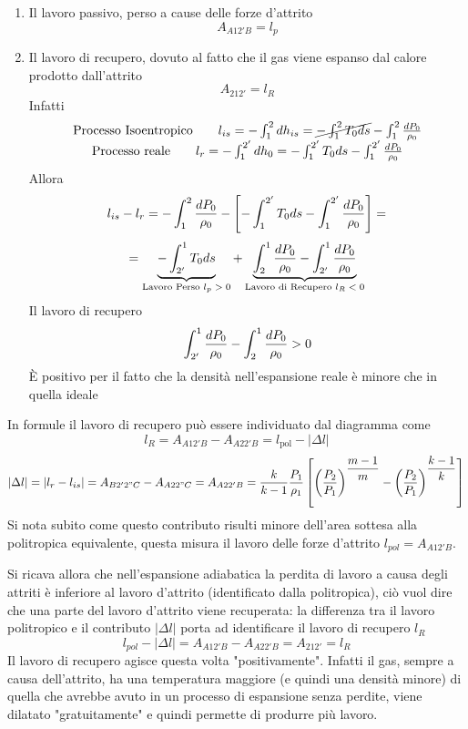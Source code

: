 \begin{adjustwidth}{2in}{}
	\begin{enumerate}
		\item Il lavoro passivo, perso a cause delle forze d'attrito
		\[A_{A12'B} = l_p\]
		\item Il lavoro di recupero, dovuto al fatto che il gas viene espanso dal calore prodotto dall'attrito 
		\[A_{212'} = l_R\]			
		Infatti
		\[\begin{matrix}
			\text{Processo Isoentropico}\qquad l_{is} = -\int_{1}^{2}dh_{is} = \cancel{-\int_{1}^{2}T_0ds}  -\int_{1}^{2} {dP_0\over\rho_0} \\
			\text{Processo reale}\qquad l_r = -\int_{1}^{2'}dh_0 = -\int_{1}^{2'}T_0ds - \int_{1}^{2'} {dP_0\over\rho_0} \\
		\end{matrix}\]
		Allora 
		\[l_{is} - l_r = -\int_{1}^{2} {dP_0\over\rho_0} - \left[-\int_{1}^{2'}T_0ds - \int_{1}^{2'} {dP_0\over\rho_0}\right] = \]
		\[ = \underbrace{-\int_{2'}^{1}T_0ds}_\text{Lavoro Perso $l_p>0$} + \underbrace{\int_{2}^{1} {dP_0\over\rho_0} - \int_{2'}^{1} {dP_0\over\rho_0}}_\text{Lavoro di Recupero $l_R<0$}\]
		Il lavoro di recupero
		\[\int_{2'}^{1} {dP_0\over\rho_0} - \int_{2}^{1} {dP_0\over\rho_0}>0\] 
		È positivo per il fatto che la densità nell'espansione reale è minore che in quella ideale  
	\end{enumerate}
	In formule il lavoro di recupero può essere individuato dal diagramma come 
	\[l_R = A_{A12'B} - A_{A22'B} =  l_\text{pol} - |\Delta l| \]
	\[|\Delta l| = |l_r-l_{is}| = A_{B2'2"C} - A_{A22"C} = A_{A22'B} = \dfrac{k}{k-1}\dfrac{P_1}{\rho_1}\left[\left(\dfrac{P_2}{P_1}\right)^{\dfrac{m-1}{m}} - \left(\dfrac{P_2}{P_1}\right)^{\dfrac{k-1}{k}}\right]\]
	Si nota subito come questo contributo risulti minore dell'area sottesa alla politropica equivalente, questa misura il lavoro delle forze d'attrito $l_{pol} = A_{A12'B}$. 
	
	Si ricava allora che nell'espansione adiabatica la perdita di lavoro a causa degli attriti è inferiore al lavoro d'attrito (identificato dalla politropica), ciò vuol dire che una parte del lavoro d'attrito viene recuperata: la differenza tra il lavoro politropico e il contributo $|\Delta l|$ porta ad identificare il lavoro di recupero $l_R$
	\[l_{pol} - |\Delta l| = A_{A12'B} - A_{A22'B} = A_{212'} = l_R\]
	Il lavoro di recupero agisce questa volta "positivamente". Infatti il gas, sempre a causa dell'attrito, ha una temperatura maggiore (e quindi una densità minore) di quella che avrebbe avuto in un processo di espansione senza perdite, viene dilatato "gratuitamente" e quindi permette di produrre più lavoro. 
\end{adjustwidth}




